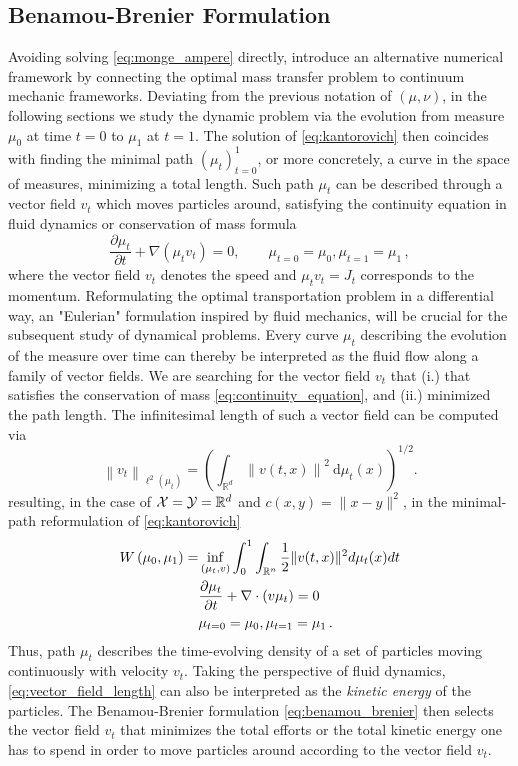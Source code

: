 \subsection{Benamou-Brenier Formulation} \label{sec:background_benamou_brenier}

Avoiding solving \eqref{eq:monge_ampere} directly, \citet{benamou2000computational} introduce an alternative numerical framework by connecting the optimal mass transfer problem to continuum mechanic frameworks.
Deviating from the previous notation of $(\mu, \nu)$, in the following sections we study the dynamic problem via the evolution from measure $\mu_0$ at time $t=0$ to $\mu_1$ at $t=1$. The solution of \eqref{eq:kantorovich} then coincides with finding the minimal path $(\mu_t)_{t=0}^1$, or more concretely, a curve in the space of measures, minimizing a total length.  
Such path $\mu_t$ can be described through a vector field $v_t$ which moves particles around, satisfying the continuity equation in fluid dynamics or conservation of mass formula
\begin{equation} \label{eq:continuity_equation}
	\frac{\partial \mu_t}{\partial t}+\nabla\left(\mu_t v_t\right)= 0, \qquad \mu_{t=0}=\mu_0, \mu_{t=1}=\mu_1\,,
\end{equation}
where the vector field $v_t$ denotes the speed and $\mu_t v_t = J_t$ corresponds to the momentum.
Reformulating the optimal transportation problem in a differential way, an "Eulerian" formulation inspired by fluid mechanics, will be crucial for the subsequent study of dynamical problems.
Every curve $\mu_t$ describing the evolution of the measure over time can thereby be interpreted as the fluid flow along a family of vector fields. We are searching for the vector field $v_t$ that (i.) that satisfies the conservation of mass \eqref{eq:continuity_equation}, and (ii.) minimized the path length.
The infinitesimal length of such a vector field can be computed via 
\begin{equation} \label{eq:vector_field_length}
	\left\|v_t\right\|_{\ell^2\left(\mu_t\right)}=\left(\int_{\mathbb{R}^d}\left\|v(t, x)\right\|^2 \mathrm{~d} \mu_t(x)\right)^{1 / 2}.
\end{equation}
resulting, in the case of ${\mathcal{X}} = {\mathcal{Y}} = \mathbb{R}^d$ and $c(x, y)=\|x-y\|^2$, in the minimal-path reformulation of \eqref{eq:kantorovich}
\begin{align}  \label{eq:benamou_brenier}
	W\left(\mu_0, \mu_1\right)=& \inf _{(\mu_t, v)} \int_0^1 \int_{\mathbb{R}^n}\frac{1}{2}\lVert v(t, x)\rVert^2 d\mu_t(x) d t \\
	& \nonumber \frac{\partial \mu_t}{\partial t}+\nabla \cdot(v \mu_t)=0 \\
	& \nonumber \mu_{t=0}=\mu_0, \mu_{t=1}=\mu_1\, .
\end{align}
Thus, path $\mu_t$ describes the time-evolving density of a set of particles moving continuously with velocity $v_t$.
Taking the perspective of fluid dynamics, \eqref{eq:vector_field_length} can also be interpreted as the \emph{kinetic energy} of the particles.
The Benamou-Brenier formulation \eqref{eq:benamou_brenier} then selects the vector field $v_t$ that minimizes the total efforts or the total kinetic energy one has to spend in order to move particles around according to the vector field $v_t$.

